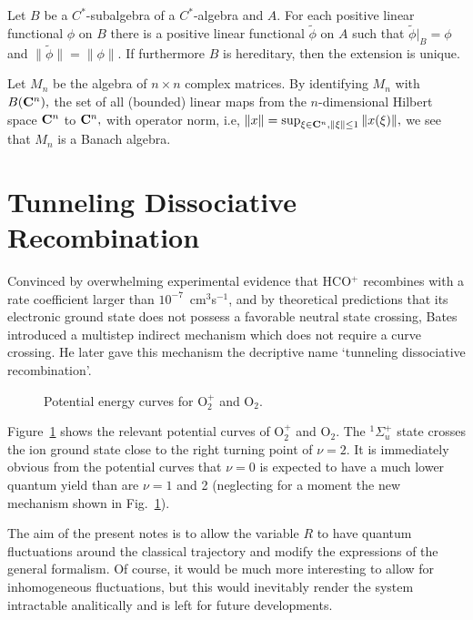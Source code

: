 \documentclass{ws-rv9x6}
\begin{document}
\begin{proposition}
Let $B$ be a $C^*$-subalgebra of a $C^*$-algebra and $A$. For 
each positive linear functional $\phi$ on $B$ there is a positive 
linear functional ${\tilde \phi}$ on $A$ such that 
${\tilde \phi}|_B=\phi$ and $\|{\tilde \phi}\|=\|\phi\|.$  
If furthermore $B$ is hereditary, then the extension is unique.
\end{proposition}

\begin{example}
Let $M_n$ be the algebra of $n\times n$ complex matrices. By
identifying $M_n$ with $B({\bf C}^n),$ the set of all (bounded) linear
maps from the $n$-dimensional Hilbert space ${\bf C}^n$ to ${\bf
C}^n,$ with operator norm, i.e, $\|x\|=\sup_{\xi\in {\bf C}^n,
\|\xi\|\le 1}\|x(\xi)\|, $ we see that $M_n$ is a Banach algebra.
\end{example}

\section{Tunneling Dissociative Recombination}

Convinced by overwhelming experimental evidence that HCO$^+$
recombines with a rate coefficient larger than
$10^{-7}$~cm$^3$s$^{-1}$, and by theoretical predictions that its
electronic ground state does not possess a favorable neutral state
crossing, Bates introduced a multistep indirect mechanism which does
not require a curve crossing.\cite{97} He later gave this mechanism
the decriptive name `tunneling dissociative recombination'.\cite{2}

\begin{figure}[th]		%
\centerline{}
\vspace*{8pt}
\caption{Potential energy curves for O$_2^+$ and O$_2$. \label{fig2}}
\end{figure}

Figure~\ref{fig2} shows the relevant potential curves of O$_2^+$ and
O$_2$. The $^1 \Sigma_u^+$ state crosses the ion ground state close to
the right turning point of $\nu=2$. It is immediately obvious from the
potential curves that $\nu=0$ is expected to have a much lower quantum
yield than are $\nu=1$ and 2 (neglecting for a moment the new
mechanism shown in Fig.~\ref{fig2}).

The aim of the present notes is to allow the variable $R$ to have
quantum fluctuations around the classical trajectory and modify the
expressions of the general formalism.  Of course, it would be much
more interesting to allow for inhomogeneous fluctuations, but this
would inevitably render the system intractable analitically and is
left for future developments.
\end{document}
